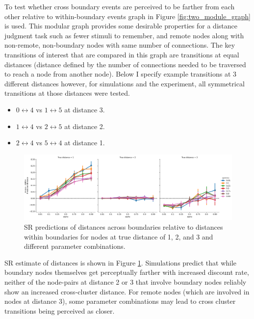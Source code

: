 To test whether cross boundary events are perceived to be farther from each other relative to within-boundary events graph in Figure \ref{fig:two_module_graph} is used. \ac{This modular graph provides some desirable properties for a distance judgment task such as fewer stimuli to remember, and remote nodes along with non-remote, non-boundary nodes with same number of connections}. The key transitions of interest that are compared in this graph are transitions at equal distances (\ac{distance defined by the number of connections needed to be traversed to reach a node from another node}). Below I specify example transitions at 3 different distances however, for simulations and the experiment, all symmetrical transitions at those distances were tested. 
\begin{itemize}
    \item $0 \leftrightarrow 4$ vs $1 \leftrightarrow 5$ at distance 3. 
    \item $1 \leftrightarrow 4$ vs $2 \leftrightarrow 5$ at distance 2. 
    \item $2 \leftrightarrow 4$ vs $5 \leftrightarrow 4$ at distance 1. 
\end{itemize}

\begin{figure}
    \centering
    \includegraphics[width = \textwidth]{chapter_notebooks/chapter_3/figures/distance_predictions.png}
    \caption{SR predictions of distances across boundaries relative to distances within boundaries for nodes at true distance of 1, 2, and 3 and different parameter combinations.}
    \label{fig:SR-distance-estimate}
\end{figure}

SR estimate of distances is shown in Figure \ref{fig:SR-distance-estimate}. Simulations predict that while boundary nodes themselves get perceptually farther with increased discount rate, neither of the node-pairs at distance 2 or 3 that involve boundary nodes reliably show an increased cross-cluster distance. \ac{For remote nodes (which are involved in nodes at distance 3), some parameter combinations may lead to cross cluster transitions being perceived as closer.}

